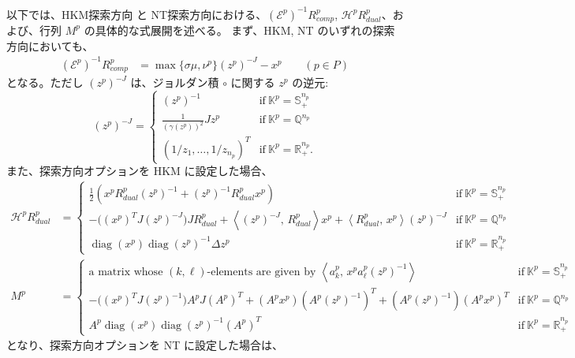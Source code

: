 \documentclass{jsarticle}
\newcommand{\inprod}[2]{\left\langle #1, \, #2 \right\rangle}
\begin{document}
以下では、HKM探索方向 と NT探索方向における、$(\mathcal{E}^p)^{-1}R^p_{comp}$, $\mathcal{H}^p R^p_{dual}$、および、行列 $M^p$ の具体的な式展開を述べる。
まず、HKM, NT のいずれの探索方向においても、
\begin{align*}
    (\mathcal{E}^p)^{-1}R^p_{comp} &= \max\{\sigma\mu, \nu^p\}(z^p)^{-J} - x^p \qquad (p \in P)
\end{align*}
となる。ただし $(z^p)^{-J}$ は、ジョルダン積 $\circ$ に関する $z^p$ の逆元:
\begin{equation*}
    (z^p)^{-J} = \begin{cases}
        (z^p)^{-1} & \text{if} ~ \mathbb{K}^p=\mathbb{S}^{n_p}_+ \\
        \frac{1}{(\gamma(z^p))^2} J z^p & \text{if} ~ \mathbb{K}^p=\mathbb{Q}^{n_p} \\
        (1/z_1, \ldots, 1/z_{n_p})^T & \text{if} ~ \mathbb{K}^p=\mathbb{R}^{n_p}_+.
    \end{cases}
\end{equation*}
また、探索方向オプションを HKM に設定した場合、
\begin{align}
    \mathcal{H}^p R^p_{dual} &= \begin{cases}
        \frac{1}{2}(x^p R^p_{dual} (z^p)^{-1} + (z^p)^{-1} R^p_{dual} x^p) & \text{if} ~ \mathbb{K}^p=\mathbb{S}^{n_p}_+\\
        - \Big( (x^p)^T J (z^p)^{-J} \Big) J R^p_{dual} + \inprod{(z^p)^{-J}}{R^p_{dual}} x^p + \inprod{R^p_{dual}}{x^p} (z^p)^{-J} & \text{if} ~ \mathbb{K}^p=\mathbb{Q}^{n_p}\\
        \operatorname{diag}(x^p) \operatorname{diag}(z^p)^{-1} \Delta z^p & \text{if} ~ \mathbb{K}^p=\mathbb{R}^{n_p}_+
    \end{cases} \label{eq:HKM_HRd}\\
    M^p &= \begin{cases} 
        \text{a matrix whose $(k,\ell)$-elements are given by } \inprod{a^p_k}{x^p a^p_\ell (z^p)^{-1}} & \text{if} ~ \mathbb{K}^p=\mathbb{S}^{n_p}_+ \\
        -\Big( (x^p)^T J (z^p)^{-1} \Big) A^p J (A^p)^T + (A^p x^p)(A^p (z^p)^{-1})^T + (A^p (z^p)^{-1})(A^p x^p)^T& \text{if} ~ \mathbb{K}^p=\mathbb{Q}^{n_p} \\
        A^p \operatorname{diag}(x^p) \operatorname{diag}(z^p)^{-1} (A^p)^T & \text{if} ~ \mathbb{K}^p=\mathbb{R}^{n_p}_+
    \end{cases} \label{eq:HKM_M}
\end{align}
となり、探索方向オプションを NT に設定した場合は、
\end{document}
